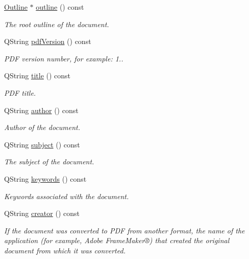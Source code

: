 \begin{DoxyCompactItemize}
\hyperlink{class_mu_p_d_f_1_1_outline}{Outline} $\ast$ \hyperlink{class_mu_p_d_f_1_1_document_a0ea90d9e549fafa6b33dd6d1eca603e6}{outline} () const 
\begin{DoxyCompactList}\small\item\em The root outline of the document. \end{DoxyCompactList}\item 
Q\-String \hyperlink{class_mu_p_d_f_1_1_document_a3635f7be582da314499899a699a2fd75}{pdf\-Version} () const 
\begin{DoxyCompactList}\small\item\em P\-D\-F version number, for example\-: 1.. \end{DoxyCompactList}\item 
Q\-String \hyperlink{class_mu_p_d_f_1_1_document_a5823c559c6c48febeeb3eb1d7d83e10d}{title} () const 
\begin{DoxyCompactList}\small\item\em P\-D\-F title. \end{DoxyCompactList}\item 
Q\-String \hyperlink{class_mu_p_d_f_1_1_document_a7f5a23afec90fffc45c1dc093aa025fd}{author} () const 
\begin{DoxyCompactList}\small\item\em Author of the document. \end{DoxyCompactList}\item 
Q\-String \hyperlink{class_mu_p_d_f_1_1_document_ae784415521f4ed962da82018bbcc7f2f}{subject} () const 
\begin{DoxyCompactList}\small\item\em The subject of the document. \end{DoxyCompactList}\item 
Q\-String \hyperlink{class_mu_p_d_f_1_1_document_a751dc7e3ed070eff251713c070a1f6e3}{keywords} () const 
\begin{DoxyCompactList}\small\item\em Keywords associated with the document. \end{DoxyCompactList}\item 
Q\-String \hyperlink{class_mu_p_d_f_1_1_document_a1d44b5bc59d43c1138a4b4afbb245c01}{creator} () const 
\begin{DoxyCompactList}\small\item\em If the document was converted to P\-D\-F from another format, the name of the application (for example, Adobe Frame\-Maker®) that created the original document from which it was converted. \end{DoxyCompactList}\item 

\end{DoxyCompactItemize}
